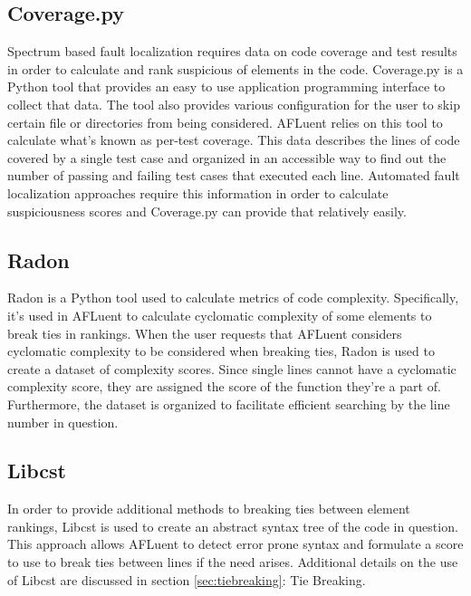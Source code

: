 \subsection{Coverage.py}
\label{subsec:coverage}

Spectrum based fault localization requires data on code coverage and test
results in order to calculate and rank suspicious of elements in the code.
Coverage.py\cite{coverage_py_website} is a Python tool that provides an easy to use application
programming interface to collect that data. The tool also provides various
configuration for the user to skip certain file or directories from being
considered. AFLuent relies on this tool to calculate what's known as per-test
coverage. This data describes the lines of code covered by a single test case
and organized in an accessible way to find out the number of passing and failing
test cases that executed each line. Automated fault localization approaches
require this information in order to calculate suspiciousness scores and
Coverage.py can provide that relatively easily.

\subsection{Radon}
\label{subsec:radon}

Radon is a Python tool used to calculate metrics of code complexity.
Specifically, it's used in AFLuent to calculate cyclomatic complexity of some
elements to break ties in rankings. When the user requests that AFLuent
considers cyclomatic complexity to be considered when breaking ties, Radon is
used to create a dataset of complexity scores. Since single lines cannot have a
cyclomatic complexity score, they are assigned the score of the function they're
a part of. Furthermore, the dataset is organized to facilitate efficient
searching by the line number in question.

\subsection{Libcst}
\label{subsec:libcst}

In order to provide additional methods to breaking ties between element
rankings, Libcst is used to create an abstract syntax tree of the code in
question. This approach allows AFLuent to detect error prone syntax and
formulate a score to use to break ties between lines if the need arises.
Additional details on the use of Libcst are discussed in section
\ref{sec:tiebreaking}: Tie Breaking.

